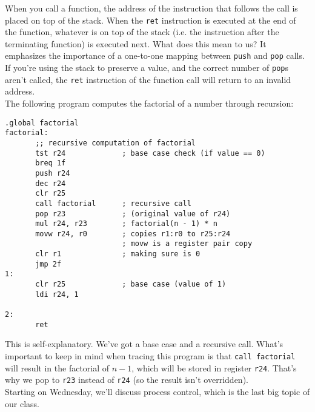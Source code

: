 When you call a function, the address of the instruction that follows the call is placed on top of the stack. When the \verb!ret! instruction is executed at the end of the function, whatever is on top of the stack (i.e. the instruction after the terminating function) is executed next. What does this mean to us? It emphasizes the importance of a one-to-one mapping between \verb!push! and \verb!pop! calls. If you're using the stack to preserve a value, and the correct number of \verb!pop!s aren't called, the \verb!ret! instruction of the function call will return to an invalid address.  \\

The following program computes the factorial of a number through recursion:

\lstset{
caption=Assembly: Factorial
}
\begin{lstlisting}
.global factorial
factorial:
       ;; recursive computation of factorial
       tst r24             ; base case check (if value == 0)
       breq 1f
       push r24
       dec r24
       clr r25
       call factorial      ; recursive call
       pop r23             ; (original value of r24)
       mul r24, r23        ; factorial(n - 1) * n
       movw r24, r0        ; copies r1:r0 to r25:r24 
                           ; movw is a register pair copy
       clr r1              ; making sure is 0
       jmp 2f
1: 
       clr r25             ; base case (value of 1)
       ldi r24, 1

2:         
       ret
\end{lstlisting}

This is self-explanatory. We've got a base case and a recursive call. What's important to keep in mind when tracing this program is that \verb!call factorial! will result in the factorial of $n - 1$, which will be stored in register \verb!r24!. That's why we pop to \verb!r23! instead of \verb!r24! (so the result isn't overridden). \\



Starting on Wednesday, we'll discuss process control, which is the last big topic of our class.